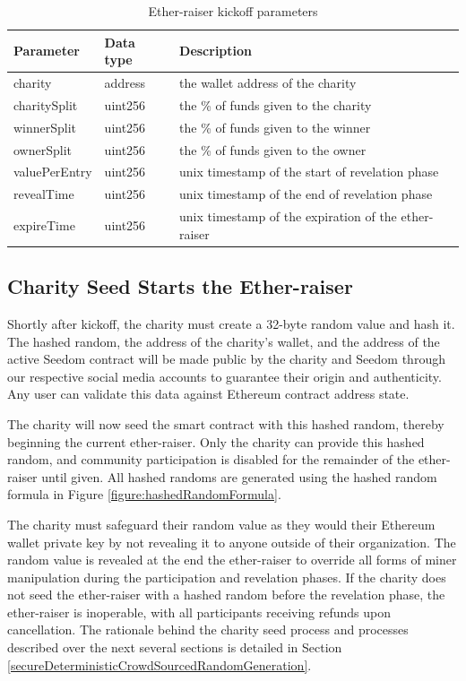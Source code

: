 \documentclass[11pt]{article}
\begin{document}
\begin{table}[H]
\begin{center}
\begin{tabular}{| l | l | l |}
\hline
\textbf{Parameter} & \textbf{Data type} & \textbf{Description} \\ \hline
charity & address & the wallet address of the charity \\ \hline
charitySplit & uint256 & the \% of funds given to the charity \\ \hline
winnerSplit & uint256 & the \% of funds given to the winner \\ \hline
ownerSplit & uint256 & the \% of funds given to the owner \\ \hline
valuePerEntry & uint256 & unix timestamp of the start of revelation phase \\ \hline
revealTime & uint256 & unix timestamp of the end of revelation phase \\ \hline
expireTime & uint256 & unix timestamp of the expiration of the ether-raiser \\ \hline
\end{tabular}
\caption{Ether-raiser kickoff parameters}
\label{tab:etherraiserKickoffParameters}
\end{center}
\end{table}

\subsection{Charity Seed Starts the Ether-raiser}

Shortly after kickoff, the charity must create a 32-byte random value and hash it. The hashed random, the address of the charity's wallet, and the address of the active Seedom contract will be made public by the charity and Seedom through our respective social media accounts to guarantee their origin and authenticity. Any user can validate this data against Ethereum contract address state.

The charity will now seed the smart contract with this hashed random, thereby beginning the current ether-raiser. Only the charity can provide this hashed random, and community participation is disabled for the remainder of the ether-raiser until given. All hashed randoms are generated using the hashed random formula in Figure \ref{figure:hashedRandomFormula}.

The charity must safeguard their random value as they would their Ethereum wallet private key by not revealing it to anyone outside of their organization. The random value is revealed at the end the ether-raiser to override all forms of miner manipulation during the participation and revelation phases. If the charity does not seed the ether-raiser with a hashed random before the revelation phase, the ether-raiser is inoperable, with all participants receiving refunds upon cancellation. The rationale behind the charity seed process and processes described over the next several sections is detailed in Section \ref{secureDeterministicCrowdSourcedRandomGeneration}.
\end{document}
